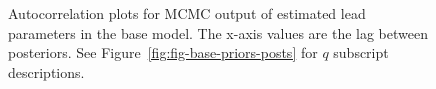 \documentclass[11pt]{book}
\begin{document}
\begin{figure}[H]

{\centering {} 

}

\caption{Autocorrelation plots for MCMC output of estimated lead parameters in the base model. The x-axis values are the lag between posteriors. See Figure~\ref{fig:fig-base-priors-posts} for \(q\) subscript descriptions.}\label{fig:fig-base-autocor}
\end{figure}
\end{document}
